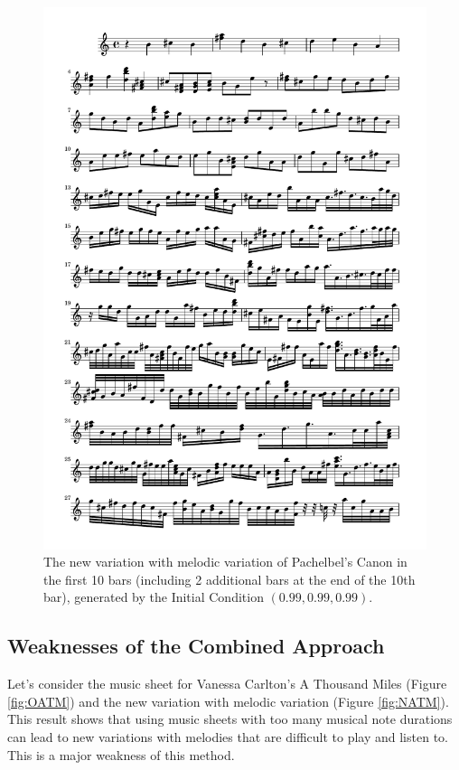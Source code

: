 \documentclass[11pt]{article}
\begin{document}
\begin{figure}
\centering
\includegraphics[trim=1cm 20.3cm 1cm 0.5cm, clip, scale=0.6]{New_CND.pdf}
\caption{The new variation with melodic variation of Pachelbel's Canon in the first 10 bars (including 2 additional bars at the end of the 10th bar), generated by the Initial Condition $(0.99, 0.99, 0.99)$.} 
\label{fig:NCND}
\end{figure}

\subsection{Weaknesses of the Combined Approach}

Let's consider the music sheet for Vanessa Carlton's A Thousand Miles (Figure \ref{fig:OATM}) and the new variation with melodic variation (Figure \ref{fig:NATM}). This result shows that using music sheets with too many musical note durations can lead to new variations with melodies that are difficult to play and listen to. This is a major weakness of this method.
\end{document}
